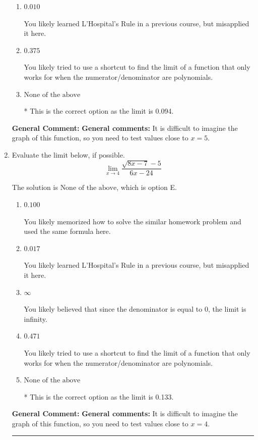 \documentclass{extbook}[14pt]
\newcommand{\litem}[1]{\item #1

\rule{\textwidth}{0.4pt}}
\begin{document}
\begin{enumerate}
{\begin{enumerate}[label=\Alph*.]
You likely believed that since the denominator is equal to 0, the limit is infinity.
\item \( 0.010 \)

You likely learned L'Hospital's Rule in a previous course, but misapplied it here.
\item \( 0.375 \)

You likely tried to use a shortcut to find the limit of a function that only works for when the numerator/denominator are polynomials.
\item \( \text{None of the above} \)

* This is the correct option as the limit is 0.094.
\end{enumerate}

\textbf{General Comment:} \textbf{General comments:} It is difficult to imagine the graph of this function, so you need to test values close to $x = 5$.
}
\litem{
Evaluate the limit below, if possible.
\[ \lim_{x \rightarrow 4} \frac{\sqrt{8x - 7} - 5}{6x - 24} \]

The solution is \( \text{None of the above} \), which is option E.\begin{enumerate}[label=\Alph*.]
\item \( 0.100 \)

You likely memorized how to solve the similar homework problem and used the same formula here.
\item \( 0.017 \)

You likely learned L'Hospital's Rule in a previous course, but misapplied it here.
\item \( \infty \)

You likely believed that since the denominator is equal to 0, the limit is infinity.
\item \( 0.471 \)

You likely tried to use a shortcut to find the limit of a function that only works for when the numerator/denominator are polynomials.
\item \( \text{None of the above} \)

* This is the correct option as the limit is 0.133.
\end{enumerate}

\textbf{General Comment:} \textbf{General comments:} It is difficult to imagine the graph of this function, so you need to test values close to $x = 4$.
}
\end{enumerate}
\end{document}
